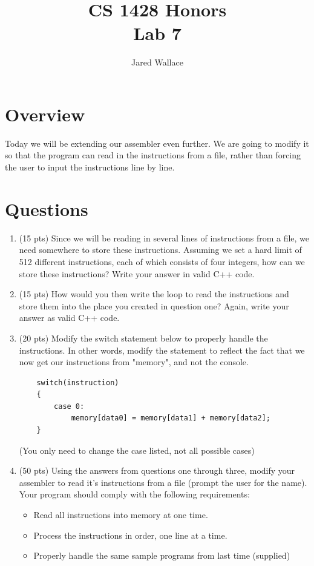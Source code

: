 \documentclass[letterpaper,12pt]{article}
\title{\Large CS 1428 Honors\\Lab 7}
\author{Jared Wallace}
\date{}
\begin{document}
\maketitle

\vspace{30mm}

\section*{Overview}
Today we will be extending our assembler even further. We are going to modify it so that
the program can read in the instructions from a file, rather than forcing the user
to input the instructions line by line.
\section*{Questions}
\begin{enumerate}
    \item (15 pts) Since we will be reading in several lines of instructions from a file,
        we need somewhere to store these instructions. Assuming we set a hard limit of
        512 different instructions, each of which consists of four integers, how can we
        store these instructions? Write your answer in valid C++ code.
    \vspace{30mm}
    \item (15 pts) How would you then write the loop to read the instructions and
        store them into the place you created in question one? Again, write your answer
        as valid C++ code.
    \vspace{30mm}
\item (20 pts) Modify the switch statement below to properly handle the instructions. In
    other words, modify the statement to reflect the fact that we now get our instructions
    from "memory", and not the console.
    \begin{lstlisting}
    switch(instruction)
    {
        case 0:
            memory[data0] = memory[data1] + memory[data2];
    }
    \end{lstlisting}
    (You only need to change the case listed, not all possible cases)
    \vspace{40mm}
\item (50 pts) Using the answers from questions one through three, modify your
    assembler to read it's instructions from a file (prompt the user for the name).
    Your program should comply with the following requirements:
    \begin{itemize}
        \item Read all instructions into memory at one time.
        \item Process the instructions in order, one line at a time.
        \item Properly handle the same sample programs from last time (supplied)
    \end{itemize}
\end{enumerate}
\end{document}
